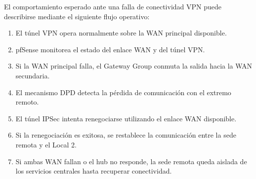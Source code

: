 \documentclass[11pt, a4paper, oneside]{report}
\begin{document}
\normalsize

El comportamiento esperado ante una falla de conectividad VPN puede describirse mediante el siguiente flujo operativo:

\begin{enumerate}
    \item El túnel VPN opera normalmente sobre la WAN principal disponible.
    \item pfSense monitorea el estado del enlace WAN y del túnel VPN.
    \item Si la WAN principal falla, el Gateway Group conmuta la salida hacia la WAN secundaria.
    \item El mecanismo DPD detecta la pérdida de comunicación con el extremo remoto.
    \item El túnel IPSec intenta renegociarse utilizando el enlace WAN disponible.
    \item Si la renegociación es exitosa, se restablece la comunicación entre la sede remota y el Local 2.
    \item Si ambas WAN fallan o el hub no responde, la sede remota queda aislada de los servicios centrales hasta recuperar conectividad.
\end{enumerate}

\renewcommand{\arraystretch}{1.3}
\footnotesize
{}
\end{document}
